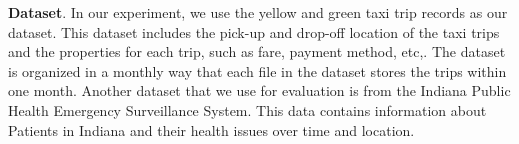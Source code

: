 {\bf Dataset}. 
In our experiment, we use the yellow and green taxi trip records as our dataset. 
This dataset includes the pick-up and drop-off location of the taxi trips and the properties for each trip, such as fare, payment method, etc,. The dataset is organized in a monthly way that each file in the dataset stores the trips within one month.
Another dataset that we use for evaluation is from the Indiana Public Health Emergency Surveillance System. This data contains information about Patients in Indiana and their health issues over time and location. 



